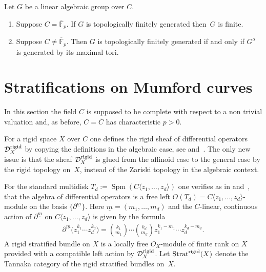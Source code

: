 \documentclass[10pt,a4paper]{amsart}
\numberwithin{equation}{section}
\begin{document}
 \begin{Observation}\label{3.8} Let $G$ be a linear algebraic group over $C$.
 \begin{enumerate}\itemsep=0pt
\item[(a)] Suppose $C=\overline{\mathbb{F}}_p$. If $G$ is topologically finitely generated then~$G$ is finite.
\item[(b)] Suppose $C\neq \overline{\mathbb{F}}_p$. Then $G$ is topologically finitely generated if and only if $G^o$ is generated by its maximal tori.
\end{enumerate}
\end{Observation}

 \section{Stratifications on Mumford curves}\label{section4}
 In this section the field $C$ is supposed to be complete with respect to a non trivial valuation and, as before, $C=\overline{C}$ has characteristic $p>0$.

 For a rigid space $X$ over $C$ one defines the rigid sheaf of differential operators $\mathcal{D}_X^{\rm rigid}$ by copying the definitions in the algebraic case, see \cite[Section~16.8.1]{EGA4} and~\cite{Gie}. The only new issue is that the sheaf $\mathcal{D}_X^{\rm rigid}$ is glued from the affinoid case to the general case by the rigid topology on~$X$, instead of the Zariski topology in the algebraic context.

 For the standard multidisk $T_d:=\operatorname{Spm}(C\langle z_1,\dots ,z_d\rangle)$ one verifies as in \cite[Th\'eor\`eme~16.11.2]{EGA4} and~\cite{Gie}, that the algebra of differential operators is a free left $O(T_d)=C\langle z_1,\dots ,z_d\rangle $-module on the basis $\big\{\partial^{\underline{m}}\big\}$. Here $\underline{m}=(m_1,\dots ,m_d)$ and the $C$-linear, continuous action of $\partial^{\underline{m}}$ on $C\langle z_1,\dots , z_d\rangle$ is given by the formula
 \begin{gather*} \partial^{\underline{m}}\big(z_1^{k_1}\cdots z_d^{k_d}\big)= {k_1\choose m_1 }\cdots {k_d\choose m_d} z_1^{k_1-m_1}\cdots z_d^{k_d-m_d}.\end{gather*}
 A rigid stratified bundle on $X$ is a locally free $O_X$-module of finite rank on $X$ provided with a compatible left action by $\mathcal{D}^{\rm rigid}_X$. Let $\operatorname{Strat}^{\rm rigid}(X)$ denote the Tannaka category of the rigid stratified bundles on~$X$.
\end{document}
